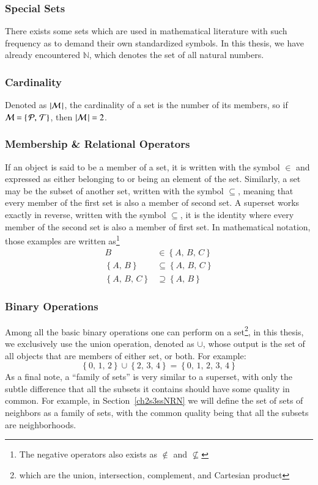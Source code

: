 %
\subsubsection{Special Sets}
There exists some sets which are used in mathematical literature with such frequency as to demand their own standardized symbols. In this thesis, we have already encountered $\mathbb{N}$, which denotes the set of all natural numbers.

%
\subsubsection{Cardinality}
Denoted as $|\mathcal{M}\,|$, the cardinality of a set is the number of its members, so if $\mathcal{M} = \left \{\,\mathcal{P},\,\mathcal{T}\right \}$, then $|\mathcal{M}\,| = 2$.

%
\subsubsection{Membership \& Relational Operators}
If an object is said to be a member of a set, it is written with the symbol $\in$ and expressed as either belonging to or being an element of the set. Similarly, a set may be the subset of another set, written with the symbol $\subseteq$, meaning that every member of the first set is also a member of second set. A superset works exactly in reverse, written with the symbol $\subseteq$, it is the identity where every member of the second set is also a member of first set. In mathematical notation, those examples are written as\footnote{The negative operators also exists as $\notin$ and $\nsubseteq$}
\begin{align}
	B & \in \left \{A,\,B,\,C\right \} \\
	\left \{A,\,B\right \} & \subseteq \left \{A,\,B,\,C\right \} \\
	\left \{A,\,B,\,C\right \} & \supseteq \left \{A,\,B\right \}
\end{align}

%
\subsubsection{Binary Operations}
Among all the basic binary operations one can perform on a set\footnote{which are the union, intersection, complement, and Cartesian product}, in this thesis, we exclusively use the union operation, denoted as $\cup$, whose output is the set of all objects that are members of either set, or both. For example:
\begin{equation}
	\left \{0,\,1,\,2\right \} \cup \left \{2,\,3,\,4\right \} = \left \{0,\,1,\,2,\,3,\,4\right \}
\end{equation}
As a final note, a ``family of sets'' is very similar to a superset, with only the subtle difference that all the subsets it contains should have some quality in common. For example, in Section~\ref{ch2s3ssNRN} we will define the set of sets of neighbors as a family of sets, with the common quality being that all the subsets are neighborhoods.

